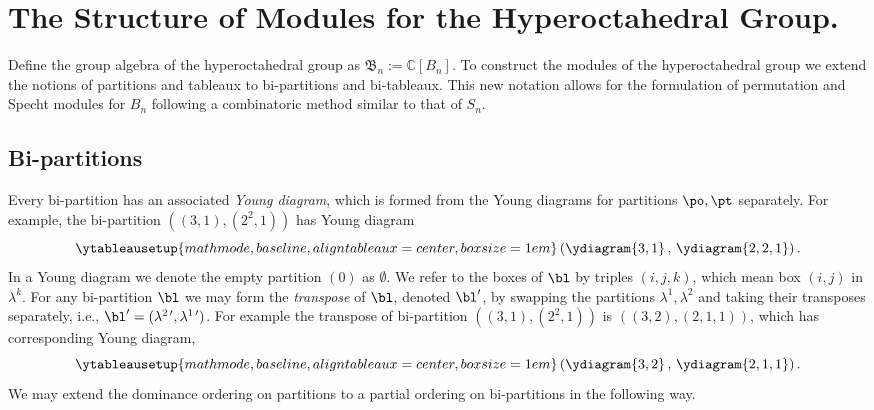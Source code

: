 \documentclass[11pt]{report}
\begin{document}
\section{The Structure of Modules for the Hyperoctahedral Group.}
\label{chpt6:subsec:modules}
Define the group algebra of the hyperoctahedral group as $\mathfrak{B}_{n} := \mathbb{C}[B_{n}]$.
To construct the modules of the hyperoctahedral group we extend the notions of partitions and tableaux to bi-partitions and bi-tableaux. This new notation allows for the formulation of permutation and Specht modules for $B_{n}$ following a combinatoric method similar to that of $S_{n}$.

\subsection{Bi-partitions}



Every bi-partition has an associated \emph{Young diagram}, which is formed from the Young diagrams for partitions $\po, \pt$ separately. For example, the bi-partition $((3,1), (2^{2},1))$ has Young diagram
\[\ytableausetup{mathmode,baseline,aligntableaux=center,boxsize=1em}\left( \ydiagram{3,1}\, , \, \ydiagram{2,2,1} \right) .\]
In a Young diagram we denote the empty partition $(0)$ as $\emptyset$. 
We refer to the boxes of $\bl$ by triples $(i,j,k)$, which mean box $(i,j)$ in $\lambda^{k}$. For any bi-partition $\bl$ we may form the \emph{transpose} of $\bl$, denoted $\bl^{\prime}$, by swapping the partitions $\lambda^{1},\lambda^{2}$ and taking their transposes separately, i.e., $\bl^{\prime} = (\lambda^{2 \,\prime}, \lambda^{1 \, \prime})$. For example the transpose of bi-partition $((3,1),(2^{2},1))$ is $((3,2),(2,1,1))$, which has corresponding Young diagram,
\[\ytableausetup{mathmode,baseline,aligntableaux=center,boxsize=1em}\left( \ydiagram{3,2}\, , \, \ydiagram{2,1,1} \right) .\]
We may extend the dominance ordering on partitions to a partial ordering on bi-partitions in the following way.
\end{document}
